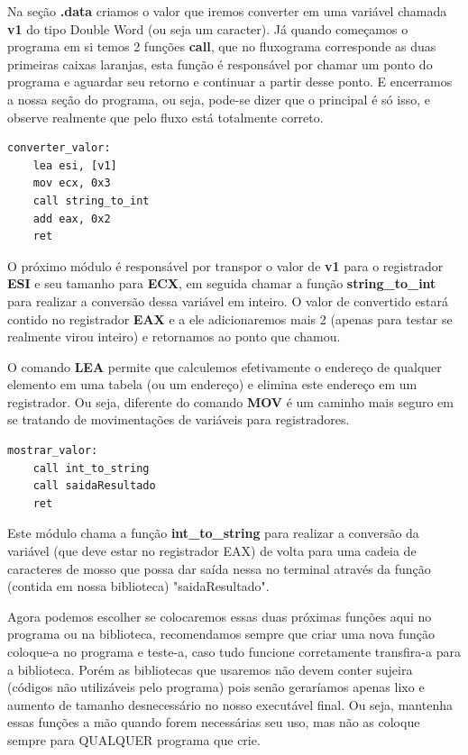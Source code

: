 Na seção \textbf{.data} criamos o valor que iremos converter em uma variável chamada \textbf{v1} do tipo Double Word (ou seja um caracter). Já quando começamos o programa em si temos 2 funções \textbf{call}, que no fluxograma corresponde as duas primeiras caixas laranjas, esta função é responsável por chamar um ponto do programa e aguardar seu retorno e continuar a partir desse ponto. E encerramos a nossa seção do programa, ou seja, pode-se dizer que o principal é só isso, e observe realmente que pelo fluxo está totalmente correto.

\begin{lstlisting}[]
converter_valor:
	lea esi, [v1]
	mov ecx, 0x3
	call string_to_int
	add eax, 0x2
	ret
\end{lstlisting}

O próximo módulo é responsável por transpor o valor de \textbf{v1} para o registrador \textbf{ESI} e seu tamanho para \textbf{ECX}, em seguida chamar a função \textbf{string\_to\_int} para realizar a conversão dessa variável em inteiro. O valor de convertido estará contido no registrador \textbf{EAX} e a ele adicionaremos mais 2 (apenas para testar se realmente virou inteiro) e retornamos ao ponto que chamou.

O comando \textbf{LEA} permite que calculemos efetivamente o endereço de qualquer elemento em uma tabela (ou um endereço) e elimina este endereço em um registrador. Ou seja, diferente do comando \textbf{MOV} é um caminho mais seguro em se tratando de movimentações de variáveis para registradores.

\begin{lstlisting}[]
mostrar_valor:
	call int_to_string
	call saidaResultado
	ret
\end{lstlisting}

Este módulo chama a função \textbf{int\_to\_string} para realizar a conversão da variável (que deve estar no registrador EAX) de volta para uma cadeia de caracteres de mosso que possa dar saída nessa no terminal através da função (contida em nossa biblioteca) "saidaResultado".

Agora podemos escolher se colocaremos essas duas próximas funções aqui no programa ou na biblioteca, recomendamos sempre que criar uma nova função coloque-a no programa e teste-a, caso tudo funcione corretamente transfira-a para a biblioteca. Porém as bibliotecas que usaremos não devem conter sujeira (códigos não utilizáveis pelo programa) pois senão geraríamos apenas lixo e aumento de tamanho desnecessário no nosso executável final. Ou seja, mantenha essas funções a mão quando forem necessárias seu uso, mas não as coloque sempre para QUALQUER programa que crie.

